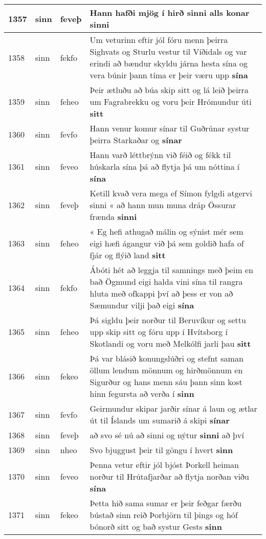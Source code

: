 \documentclass{article}
\begin{document}
\begin{longtable}{p{1cm}|p{1cm}|p{1cm}|p{13cm}}
\hline
1357&sinn&feveþ&Hann hafði mjög í hirð sinni alls konar \textbf{sinni} \\
\hline
1358&sinn&fekfo&Um veturinn eftir jól fóru menn þeirra Sighvats og Sturlu vestur til Víðidals og var erindi að bændur skyldu járna hesta sína og vera búnir þann tíma er þeir væru upp \textbf{sína} \\
\hline
1359&sinn&feheo&Þeir ætluðu að búa skip sitt og lá leið þeirra um Fagrabrekku og voru þeir Hrómundur úti \textbf{sitt} \\
\hline
1360&sinn&fevfo&Hann venur komur sínar til Guðrúnar systur þeirra Starkaðar og \textbf{sínar} \\
\hline
1361&sinn&feveo&Hann varð léttbrýnn við féið og fékk til húskarla sína þá að flytja þá um nóttina í \textbf{sína} \\
\hline
1362&sinn&feveþ&Ketill kvað vera mega ef Símon fylgdi atgervi sinni « að hann mun muna dráp Össurar frænda \textbf{sinni} \\
\hline
1363&sinn&feheo&« Eg hefi athugað málin og sýnist mér sem eigi hæfi ágangur við þá sem goldið hafa of fjár og flýið land \textbf{sitt} \\
\hline
1364&sinn&fekfo&Ábóti hét að leggja til samnings með þeim en bað Ögmund eigi halda vini sína til rangra hluta með ofkappi því að þess er von að Sæmundur vilji það eigi \textbf{sína} \\
\hline
1365&sinn&feheo&Þá sigldu þeir norður til Beruvíkur og settu upp skip sitt og fóru upp í Hvítsborg í Skotlandi og voru með Melkólfi jarli þau \textbf{sitt} \\
\hline
1366&sinn&fekeo&Þá var blásið konungslúðri og stefnt saman öllum lendum mönnum og hirðmönnum en Sigurður og hans menn sáu þann sinn kost hinn fegursta að verða í \textbf{sinn} \\
\hline
1367&sinn&fevfo&Geirmundur skipar jarðir sínar á laun og ætlar út til Íslands um sumarið á skipi \textbf{sínar} \\
\hline
1368&sinn&feveþ&að svo sé nú að sinni og nýtur \textbf{sinni} að því\\
\hline
1369&sinn&nheo&Svo bjuggust þeir til göngu í hvert \textbf{sinn} \\
\hline
1370&sinn&feveo&Þenna vetur eftir jól bjóst Þorkell heiman norður til Hrútafjarðar að flytja norðan viðu \textbf{sína} \\
\hline
1371&sinn&fekeo&Þetta hið sama sumar er þeir feðgar færðu bústað sinn reið Þorbjörn til þings og hóf bónorð sitt og bað systur Gests \textbf{sinn} \\

\end{longtable}
\end{document}

